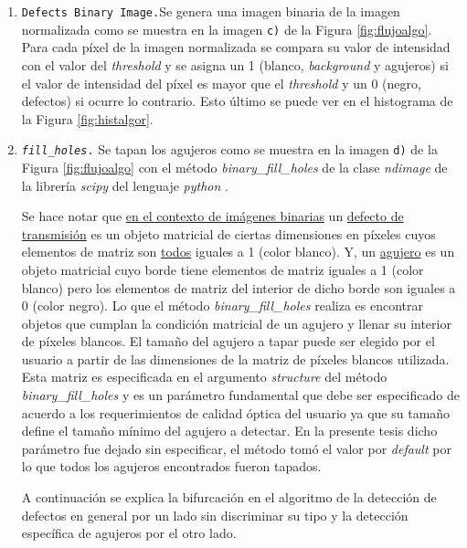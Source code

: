 \begin{enumerate}
\item \texttt{Defects Binary Image.}Se genera una imagen binaria de la imagen normalizada como se muestra en la imagen \texttt{c)} de la Figura \ref{fig:flujoalgo}. Para cada píxel de la imagen normalizada se compara su valor de intensidad con el valor del \textit{threshold} y se asigna un 1 (blanco, \textit{background} y agujeros) si el valor de intensidad del píxel es mayor que el \textit{threshold} y un 0 (negro, defectos) si ocurre lo contrario. Esto último se puede ver en el histograma de la Figura \ref{fig:histalgor}.
\item \texttt{\textit{fill\_holes}.} Se tapan los agujeros como se muestra en la imagen \texttt{d)} de la Figura \ref{fig:flujoalgo} con el método \textit{binary\_fill\_holes} de la clase \textit{ndimage} de la librería \textit{scipy} del lenguaje \textit{python} \cite{scipy}.

\hspace{0.5cm}Se hace notar que \underline{en el contexto de imágenes binarias} un \underline{defecto de transmisión} es un objeto matricial de ciertas dimensiones en píxeles cuyos elementos de matriz son \underline{todos} iguales a 1 (color blanco). Y, un \underline{agujero} es un objeto matricial cuyo borde tiene elementos de matriz iguales a 1 (color blanco) pero los elementos de matriz del interior de dicho borde son iguales a 0 (color negro). Lo que el método \textit{binary\_fill\_holes} realiza es encontrar objetos que cumplan la condición matricial de un agujero y llenar su interior de píxeles blancos. El tamaño del agujero a tapar puede ser elegido por el usuario a partir de las dimensiones de la matriz de píxeles blancos utilizada. Esta matriz es especificada en el argumento \textit{structure} del método \textit{binary\_fill\_holes} y es un parámetro fundamental que debe ser especificado de acuerdo a los requerimientos de calidad óptica del usuario ya que su tamaño define el tamaño mínimo del agujero a detectar. En la presente tesis dicho parámetro fue dejado sin especificar, el método tomó el valor por \textit{default} por lo que todos los agujeros encontrados fueron tapados.

\hspace{0.5cm}A continuación se explica la bifurcación en el algoritmo de la detección de defectos en general por un lado sin discriminar su tipo y la detección específica de agujeros por el otro lado.


\end{enumerate}
